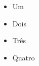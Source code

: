 \begin{itemize}
   \item Um
   \pause
   \item Dois
   \pause
   \item Três
   \pause
   \item Quatro
\end{itemize}